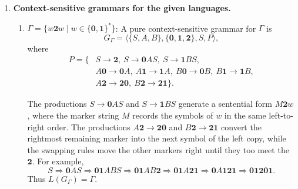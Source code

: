 \begin{enumerate}[{8.}1. ]
\begin{enumerate}
\item $L_2 = \{x \in \{\pmb{a},\pmb{b}\}^* \mid |x|_{\pmb{a}} \neq |x|_{\pmb{b}}\}$:
\[
\begin{aligned}
S &\to A \mid B\\
E &\to \pmb{a}E\pmb{b}E \mid \pmb{b}E\pmb{a}E \mid \lambda\\
A &\to E\pmb{a}E \mid E\pmb{a}A\\
B &\to E\pmb{b}E \mid E\pmb{b}B.
\end{aligned}
\]
Here $E$ generates the words with equally many $\pmb{a}$'s and $\pmb{b}$'s.
Then $A$ inserts one or more extra $\pmb{a}$'s between balanced pieces, so it
generates exactly the words with more $\pmb{a}$'s than $\pmb{b}$'s. The
productions for $B$ do the mirror-image job with extra $\pmb{b}$'s, so $B$
generates exactly the words with more $\pmb{b}$'s than $\pmb{a}$'s.

\item Postfix expressions over $\{\pmb{A},\pmb{B},\pmb{+},\pmb{-}\}$:
$S \to \pmb{A} \mid \pmb{B} \mid SS\pmb{+} \mid SS\pmb{-}$.

\item Parenthesized infix expressions over $\{\pmb{A},\pmb{B},\pmb{+},\pmb{-},\pmb{(},\pmb{)}\}$:
$S \to \pmb{A} \mid \pmb{B} \mid \pmb{(}S\pmb{+}S\pmb{)} \mid \pmb{(}S\pmb{-}S\pmb{)}$.
\end{enumerate}

\item \textbf{Context-sensitive grammars for the given languages.}

\begin{enumerate}
\item $\Gamma = \{w\pmb{2}w \mid w \in \{\pmb{0},\pmb{1}\}^*\}$:
A pure context-sensitive grammar for $\Gamma$ is
\[
G_\Gamma=\langle\{S,A,B\},\{\pmb{0},\pmb{1},\pmb{2}\},S,P\rangle,
\]
where
\begin{align*}
P=\{&S\to\pmb{2},\ S\to\pmb{0}A S,\ S\to\pmb{1}B S,\\
&A\pmb{0}\to\pmb{0}A,\ A\pmb{1}\to\pmb{1}A,\ B\pmb{0}\to\pmb{0}B,\ B\pmb{1}\to\pmb{1}B,\\
&A\pmb{2}\to\pmb{20},\ B\pmb{2}\to\pmb{21}\}.
\end{align*}

The productions $S\to\pmb{0}AS$ and $S\to\pmb{1}BS$ generate a sentential form
$M\pmb{2}w$, where the marker string $M$ records the symbols of $w$ in the same
left-to-right order.  The productions $A\pmb{2}\to\pmb{20}$ and
$B\pmb{2}\to\pmb{21}$ convert the rightmost remaining marker into the next
symbol of the left copy, while the swapping rules move the other markers right
until they too meet the $\pmb{2}$.  For example,
\[
S\Rightarrow \pmb{0}AS \Rightarrow \pmb{01}ABS \Rightarrow \pmb{01}AB\pmb{2}
\Rightarrow \pmb{01}A\pmb{21} \Rightarrow \pmb{0}A\pmb{121}
\Rightarrow \pmb{01201}.
\]
Thus $L(G_\Gamma)=\Gamma$.


\end{enumerate}
\end{enumerate}
